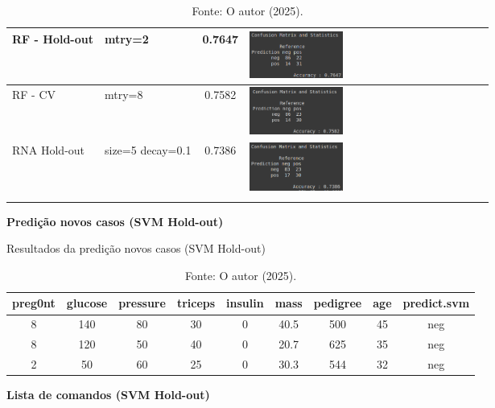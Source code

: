 \begin{longtable}{|>{\centering\arraybackslash}p{3cm}|>{\centering\arraybackslash}m{2.5cm}|c|m{7cm}|}
\hline
RF - Hold-out & mtry=2 & 0.7647 & \includegraphics[width=0.4\textwidth]{apendices/fig/8_IAA008_12.png} \\
\hline
RF - CV  & mtry=8 & 0.7582 & \includegraphics[width=0.4\textwidth]{apendices/fig/8_IAA008_13.png} \\
\hline
RNA Hold-out  & size=5 decay=0.1 & 0.7386 & \includegraphics[width=0.4\textwidth]{apendices/fig/8_IAA008_14.png} \\
\hline
\caption*{Fonte: O autor (2025).}
\end{longtable}


\begin{center}
    \textbf{Predição novos casos (SVM Hold-out)}
\end{center}

\begin{table}[H]
\centering
\caption{Resultados da predição novos casos (SVM Hold-out)}
\begin{tabular}{|c|c|c|c|c|c|c|c|c|}
\hline
preg0nt & glucose & pressure & triceps & insulin & mass & pedigree & age & predict.svm \\
\hline
8 & 140 & 80 & 30 & 0 & 40.5 & 500 & 45 & neg \\
\hline
8 & 120 & 50 & 40 & 0 & 20.7 & 625 & 35 & neg \\
\hline
2 & 50  & 60 & 25 & 0 & 30.3 & 544 & 32 & neg \\
\hline
\end{tabular}
\caption*{Fonte: O autor (2025).}
\end{table}

\begin{center}
    \textbf{Lista de comandos (SVM Hold-out)}
\end{center}

